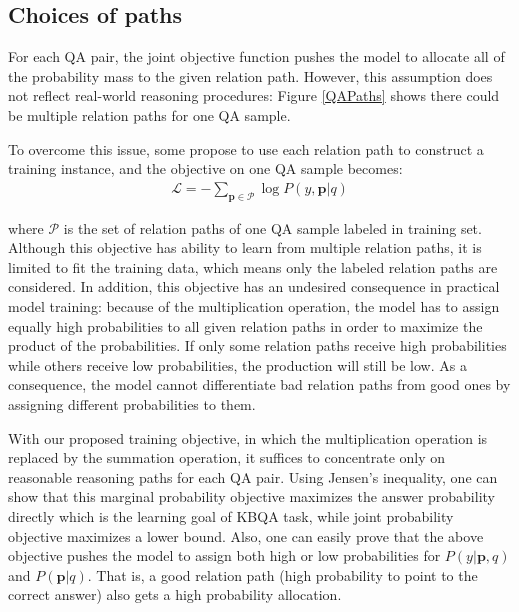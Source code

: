 \subsection{Choices of paths} 
For each QA pair, the joint objective function pushes the model to allocate all of the probability mass to the given relation path. However, this assumption does not reflect real-world reasoning procedures: Figure \ref{QAPaths} shows there could be multiple relation paths for one QA sample. 



 To overcome this issue, some propose to use each relation path to construct a training instance, and the objective on one QA sample becomes:
\begin{align}
\mathcal{L} = -\sum_{\mathbf{p}\in \mathcal{P}}\log P(y,\mathbf{p}|q)
\end{align}

where $\mathcal{P}$ is the set of relation paths of one QA sample labeled in training set. Although this objective has ability to learn from multiple relation paths, it is limited to fit the training data, which means only the labeled relation paths are considered.
 In addition, this objective has an undesired consequence in practical model training: because of the multiplication operation, the model has to assign equally high probabilities to all given relation paths in order to maximize the product of the probabilities. If only some relation paths receive high probabilities while others receive low probabilities, the production will still be low. As a consequence, the model cannot differentiate bad relation paths from good ones by assigning different  probabilities to them.
 
 
With our proposed training objective, in which the multiplication operation is replaced by the summation operation, it suffices to concentrate only on reasonable reasoning paths for each QA pair. Using Jensen's inequality, one can show that this marginal probability objective maximizes the answer probability directly which is the learning goal of KBQA task, while joint probability objective maximizes a lower bound. Also, one can easily prove that the above objective pushes the model to assign both high or low probabilities for $P(y|\mathbf{p},q)$ and $P(\mathbf{p}|q)$. That is, a good relation path (high probability to point to the correct answer) also gets a high probability allocation. %



 

